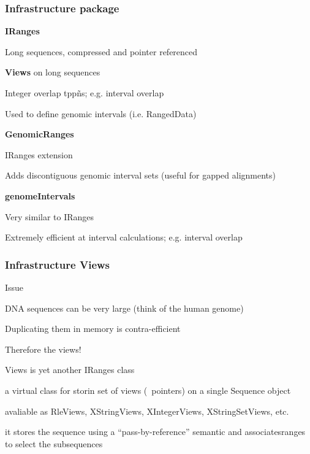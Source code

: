 \documentclass{beamer}
\begin{document}
\begin{frame}
\frametitle{Infrastructure package}
 \bit
      \item \textbf{IRanges}
        \bit
	          \item Long sequences, compressed and pointer referenced
	          \item \textbf{Views} on long sequences
	          \item Integer overlap tppñs; e.g. interval overlap
	          \item Used to define genomic intervals (i.e. RangedData)
        \eit
      \item \textbf{GenomicRanges} \hspace{4.1cm} 
        \bit
	          \item IRanges extension 
	          \item Adds discontiguous genomic interval sets (useful for gapped alignments)
        \eit
      \item \textbf{genomeIntervals} \hspace{4cm} 
        \bit
	          \item Very similar to IRanges  
	          \item Extremely efficient at interval calculations; e.g. interval overlap
        \eit
 \eit
\end{frame}


\begin{frame}
\frametitle{Infrastructure Views}
 \bit
    \item Issue
      \bit
	  \item DNA sequences can be very large (think of the human genome)
	  \item Duplicating them in memory is contra-efficient
      \eit
     \item Therefore the views!
      \bit
	  \item Views is yet another IRanges class
	    \bit
		      \item a virtual class for storin set of views (~pointers) on a single Sequence object
		      \item avaliable as RleViews, XStringViews, XIntegerViews, XStringSetViews, etc.
		      \item it stores the sequence using a ``pass-by-reference'' semantic and associatesranges to select the subsequences
	    \eit
      \eit
 \eit
\end{frame}
\end{document}
